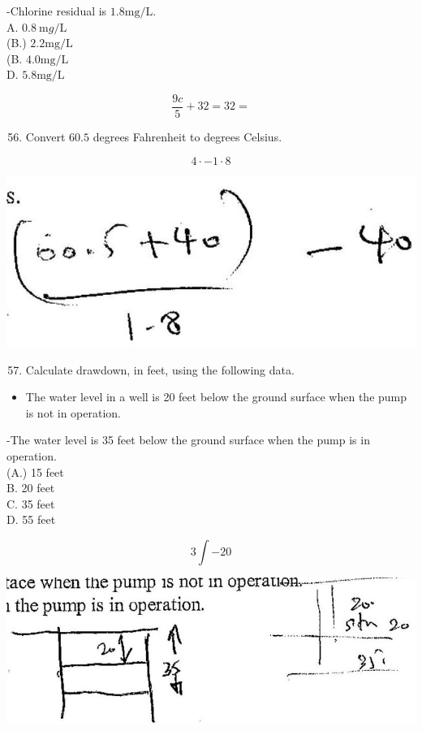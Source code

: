 \documentclass[10pt]{article}
\begin{document}
-Chlorine residual is $1.8 \mathrm{mg} / \mathrm{L}$.\\
A. $0.8 \mathrm{~m} g / \mathrm{L}$\\
(B.) $2.2 \mathrm{mg} / \mathrm{L}$\\
(B. $4.0 \mathrm{mg} / \mathrm{L}$\\
D. $5.8 \mathrm{mg} / \mathrm{L}$

$$
\frac{9 c}{5}+32=32=
$$

\begin{enumerate}
  \setcounter{enumi}{55}
  \item Convert $60.5$ degrees Fahrenheit to degrees Celsius.
\end{enumerate}

$$
4 \cdot-1 \cdot 8
$$

\includegraphics[max width=\textwidth]{2022_11_11_6852287475e47d0e3aceg-08}

\begin{enumerate}
  \setcounter{enumi}{56}
  \item Calculate drawdown, in feet, using the following data.
\end{enumerate}

\begin{itemize}
  \item The water level in a well is 20 feet below the ground surface when the pump is not in operation.
\end{itemize}

-The water level is 35 feet below the ground surface when the pump is in operation.\\
(A.) 15 feet\\
B. 20 feet\\
C. 35 feet\\
D. 55 feet

$$
3 \int-20
$$

\includegraphics[max width=\textwidth]{2022_11_11_6852287475e47d0e3aceg-08(1)}
\end{document}
